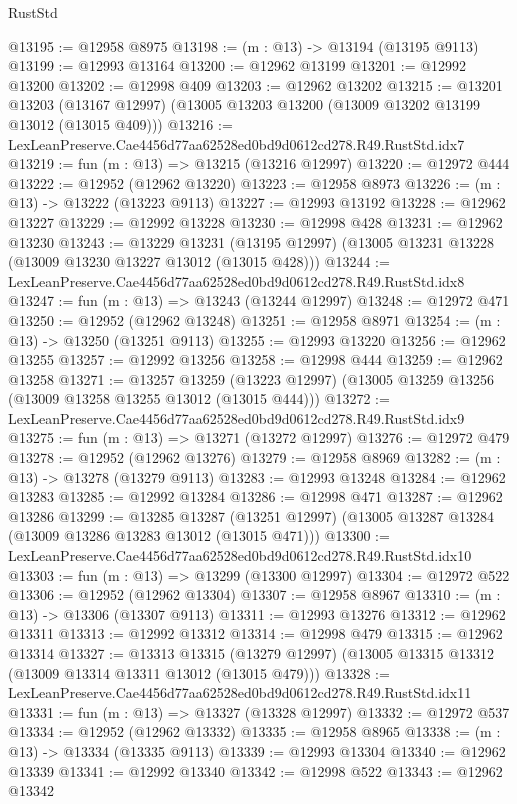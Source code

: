 \begin{lexlean}{RustStd}
\begin{coremodule}
@13195 := @12958 @8975
@13198 := (m : @13) -> @13194 (@13195 @9113)
@13199 := @12993 @13164
@13200 := @12962 @13199
@13201 := @12992 @13200
@13202 := @12998 @409
@13203 := @12962 @13202
@13215 := @13201
    @13203
    (@13167 @12997)
    (@13005 @13203 @13200 (@13009 @13202 @13199 @13012 (@13015 @409)))
@13216 := LexLeanPreserve.Cae4456d77aa62528ed0bd9d0612cd278.R49.RustStd.idx7
@13219 := fun (m : @13) => @13215 (@13216 @12997)
@13220 := @12972 @444
@13222 := @12952 (@12962 @13220)
@13223 := @12958 @8973
@13226 := (m : @13) -> @13222 (@13223 @9113)
@13227 := @12993 @13192
@13228 := @12962 @13227
@13229 := @12992 @13228
@13230 := @12998 @428
@13231 := @12962 @13230
@13243 := @13229
    @13231
    (@13195 @12997)
    (@13005 @13231 @13228 (@13009 @13230 @13227 @13012 (@13015 @428)))
@13244 := LexLeanPreserve.Cae4456d77aa62528ed0bd9d0612cd278.R49.RustStd.idx8
@13247 := fun (m : @13) => @13243 (@13244 @12997)
@13248 := @12972 @471
@13250 := @12952 (@12962 @13248)
@13251 := @12958 @8971
@13254 := (m : @13) -> @13250 (@13251 @9113)
@13255 := @12993 @13220
@13256 := @12962 @13255
@13257 := @12992 @13256
@13258 := @12998 @444
@13259 := @12962 @13258
@13271 := @13257
    @13259
    (@13223 @12997)
    (@13005 @13259 @13256 (@13009 @13258 @13255 @13012 (@13015 @444)))
@13272 := LexLeanPreserve.Cae4456d77aa62528ed0bd9d0612cd278.R49.RustStd.idx9
@13275 := fun (m : @13) => @13271 (@13272 @12997)
@13276 := @12972 @479
@13278 := @12952 (@12962 @13276)
@13279 := @12958 @8969
@13282 := (m : @13) -> @13278 (@13279 @9113)
@13283 := @12993 @13248
@13284 := @12962 @13283
@13285 := @12992 @13284
@13286 := @12998 @471
@13287 := @12962 @13286
@13299 := @13285
    @13287
    (@13251 @12997)
    (@13005 @13287 @13284 (@13009 @13286 @13283 @13012 (@13015 @471)))
@13300 := LexLeanPreserve.Cae4456d77aa62528ed0bd9d0612cd278.R49.RustStd.idx10
@13303 := fun (m : @13) => @13299 (@13300 @12997)
@13304 := @12972 @522
@13306 := @12952 (@12962 @13304)
@13307 := @12958 @8967
@13310 := (m : @13) -> @13306 (@13307 @9113)
@13311 := @12993 @13276
@13312 := @12962 @13311
@13313 := @12992 @13312
@13314 := @12998 @479
@13315 := @12962 @13314
@13327 := @13313
    @13315
    (@13279 @12997)
    (@13005 @13315 @13312 (@13009 @13314 @13311 @13012 (@13015 @479)))
@13328 := LexLeanPreserve.Cae4456d77aa62528ed0bd9d0612cd278.R49.RustStd.idx11
@13331 := fun (m : @13) => @13327 (@13328 @12997)
@13332 := @12972 @537
@13334 := @12952 (@12962 @13332)
@13335 := @12958 @8965
@13338 := (m : @13) -> @13334 (@13335 @9113)
@13339 := @12993 @13304
@13340 := @12962 @13339
@13341 := @12992 @13340
@13342 := @12998 @522
@13343 := @12962 @13342

\end{coremodule}
\end{lexlean}
